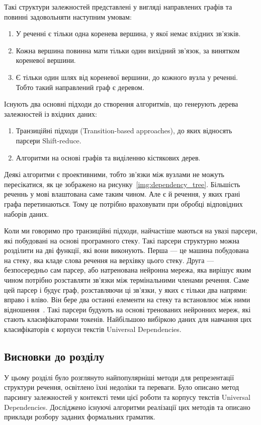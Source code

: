 Такі структури залежностей представлені у вигляді направлених графів та
повинні задовольняти наступним умовам:
\begin{enumerate}
    \item У реченні є тільки одна коренева вершина, у якої немає вхідних зв'язків.
    \item Кожна вершина повинна мати тільки один вихідний зв'язок, за
    винятком кореневої вершини.
    \item Є тільки один шлях від кореневої вершини, до кожного
    вузла у реченні. Тобто такий направлений граф є деревом.
\end{enumerate}

Існують два основні підходи до створення алгоритмів, що генерують дерева
залежностей із вхідних даних:
\begin{enumerate}
    \item Транзиційні підходи (Transition-based approaches), до яких відносять парсери
    Shift-reduce.
    \item Алгоритми на основі графів та виділенню кістякових дерев.
\end{enumerate}

Деякі алгоритми є проективними, тобто зв'язки між вузлами не можуть пересікатися, як
це зображено на рисунку~\ref{img:dependency_tree}. Більшість реченнь у мові
влаштована саме таким чином. Але є й речення, у яких грані графа перетинаються. Тому це
потрібно враховувати при обробці відповідних наборів даних.

Коли ми говоримо про транзиційні підходи, найчастіше маються на увазі
парсери, які побудовані на основі програмного стеку. Такі парсери структурно можна
розділити на дві функції, які вони виконують. Перша --- це машина побудована на стеку,
яка кладе слова речення на верхівку цього стеку. Друга --- безпосередньо
сам парсер, або натренована нейронна мережа, яка вирішує яким чином потрібно
розставляти зв'язки між термінальними членами речення. Саме цей парсер і будує
граф, розставляючи ці зв'язки, у яких є тільки два напрями: вправо і вліво.
Він бере два останні елементи на стеку та встановлює між ними відношення~\cite{bib8}.
Такі парсери будують на основі тренованих нейронних мереж, які
стають класифікаторами токенів. Найбільшою вибіркою даних для навчання цих класифікаторів
є корпуси текстів Universal Dependencies.


\subsection*{Висновки до розділу }
У цьому розділі було розглянуто найпопулярніші методи для репрезентації структури речення, освітлено їхні недоліки та переваги. Було описано метод парсингу залежностей у контексті теми цієї роботи та корпусу текстів Universal
Dependencies. Досліджено існуючі алгоритми реалізації цих методів та описано
приклади розбору заданих формальних граматик.